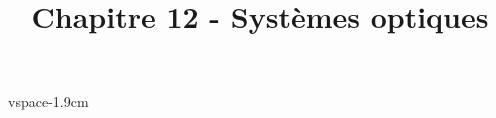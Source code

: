 \documentclass[12pt,a4paper]{article}
\title{Chapitre 12 - Systèmes optiques}
\date{}
\author{}
\begin{document}
\maketitle
vspace{-1.9cm}
\end{document}
